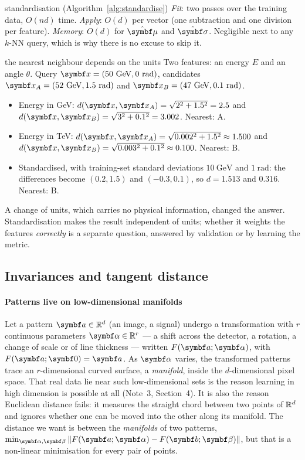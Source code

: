 \documentclass[11pt]{article}
\begin{document}
\begin{runtime}{standardisation (Algorithm~\ref{alg:standardise})}
\emph{Fit}: two passes over the training data, $O(nd)$ time. \emph{Apply}: $O(d)$ per vector (one subtraction and
one division per feature). \emph{Memory}: $O(d)$ for $\hat{\vmu}$ and $\hat{\vect{\sigma}}$. Negligible next to
any $k$-NN query, which is why there is no excuse to skip it.
\end{runtime}

\begin{worked}{the nearest neighbour depends on the units}
Two features: an energy $E$ and an angle $\theta$. Query $\x = (50\ \mathrm{GeV}, 0\ \mathrm{rad})$, candidates
$\x_A = (52\ \mathrm{GeV}, 1.5\ \mathrm{rad})$ and $\x_B = (47\ \mathrm{GeV}, 0.1\ \mathrm{rad})$.
\begin{itemize}
\item Energy in GeV: $d(\x, \x_A) = \sqrt{2^2 + 1.5^2} = 2.5$ and $d(\x, \x_B) = \sqrt{3^2 + 0.1^2} = 3.002$.
Nearest: A.
\item Energy in TeV: $d(\x, \x_A) = \sqrt{0.002^2 + 1.5^2} \approx 1.500$ and
$d(\x, \x_B) = \sqrt{0.003^2 + 0.1^2} \approx 0.100$. Nearest: B.
\item Standardised, with training-set standard deviations $10\ \mathrm{GeV}$ and $1\ \mathrm{rad}$: the differences
become $(0.2, 1.5)$ and $(-0.3, 0.1)$, so $d = 1.513$ and $0.316$. Nearest: B.
\end{itemize}
A change of units, which carries no physical information, changed the answer. Standardisation makes the result
independent of units; whether it weights the features \emph{correctly} is a separate question, answered by validation
or by learning the metric.
\end{worked}

\subsection{Invariances and tangent distance}\label{sec:tangent}

\paragraph{Patterns live on low-dimensional manifolds} Let a pattern $\vect{a} \in \R^d$ (an image, a signal) undergo a
transformation with $r$ continuous parameters $\vect{\alpha} \in \R^r$ --- a shift across the detector, a rotation, a
change of scale or of line thickness --- written $F(\vect{a}; \vect{\alpha})$, with $F(\vect{a}; \vect{0}) =
\vect{a}$. As $\vect{\alpha}$ varies, the transformed patterns trace an $r$-dimensional curved surface, a
\emph{manifold}, inside the $d$-dimensional pixel space. That real data lie near such low-dimensional sets is the
reason learning in high dimension is possible at all (Note~3, Section~4). It is also the reason Euclidean distance
fails: it measures the straight chord between two points of $\mathbb{R}^d$ and ignores whether one can be moved into the other
along its manifold. The distance we want is between the \emph{manifolds} of two patterns, $\min_{\vect{\alpha},
\vect{\beta}} \norm{F(\vect{a}; \vect{\alpha}) - F(\vect{b}; \vect{\beta})}$, but that is a non-linear minimisation
for every pair of points.
\end{document}
